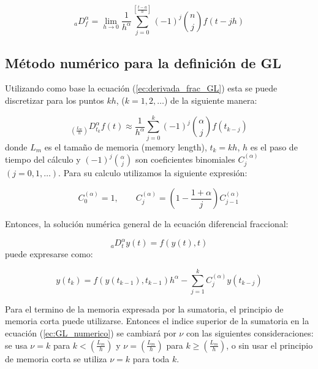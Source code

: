 	\begin{equation}
		_{a}D_{f}^{\alpha} = \lim_{h \to 0 } \frac{1}{h^{\alpha}} \sum_{j = 0}^{\left[ \frac{t-a}{h}  \right]} (-1)^{j} \binom{n}{j} f(t - jh)
	\end{equation}

		\subsection{Método numérico para la definición de GL}
		
	Utilizando como base la ecuación (\ref{ec:derivada_frac_GL}) esta se puede discretizar para los puntos $kh$, ($k = 1,2,\ldots$) de la siguiente manera:
			
	\begin{equation}
		_{\left( \frac{L_{m}}{h} \right)} D^{\alpha}_{t_{k}} f(t) \approx \frac{1}{h^{\alpha}} \sum_{j=0}^{k}(-1)^{j}  \binom{\alpha}{j} f(t_{k-j})
	\end{equation}
	donde $L_{m}$ es el tamaño de memoria (memory length), $t_{k} = kh$, $h$ es el paso de tiempo del cálculo y $(-1)^{j}\binom{\alpha}{j}$ son coeficientes binomiales $C_{j}^{(\alpha)}$ $(j=0,1,\ldots)$. Para su calculo utilizamos la siguiente expresión:
		
	\begin{equation}
		C_{0}^{(\alpha)} = 1, \qquad  C_{j}^{(\alpha)} = \left( 1 - \frac{1 + \alpha}{j} \right) C_{j-1}^{(\alpha)}
	\end{equation}
			
	Entonces, la solución numérica general de la ecuación diferencial fraccional:
		
	\begin{equation}
	 	_{a}D^{\alpha}_{t} y(t) = f(y(t), t)
	\end{equation}
	puede expresarse como:
		
	\begin{equation}
		y(t_{k}) = f(y(t_{k-1}), t_{k-1}) h^{\alpha} - \sum_{j=1}^{k} C_{j}^{(\alpha)} y(t_{k-j})
		\label{ec:GL_numerico}
	\end{equation}

	Para el termino de la memoria expresada por la sumatoria, el principio de memoria corta puede utilizarse. Entonces el indice superior de la sumatoria en la ecuación (\ref{ec:GL_numerico}) se cambiará por $\nu$ con las siguientes consideraciones: se usa $\nu = k$ para $k < \left( \frac{L_{m}}{h} \right)$ y $\nu = \left( \frac{L_{m}}{h} \right)$ para $k \geq (\frac{L_{m}}{h})$, o sin usar el principio de memoria corta se utiliza $\nu = k$ para toda $k$. 
	
